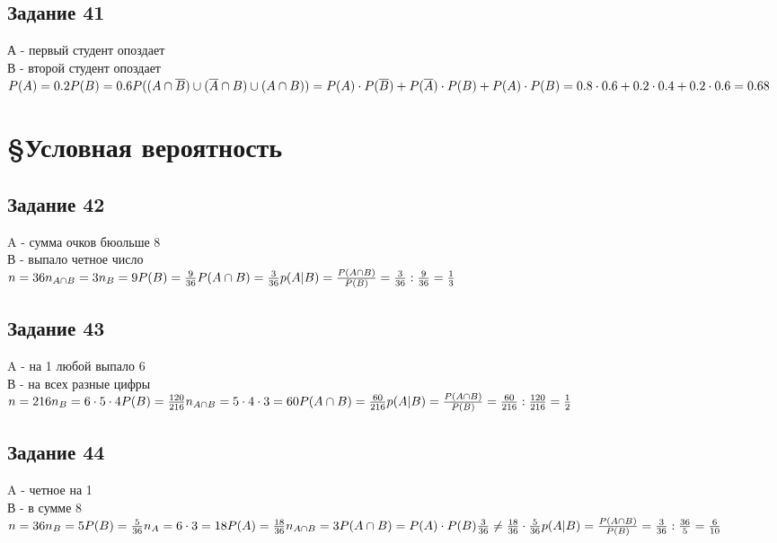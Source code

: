 \documentclass[12pt]{article}
\begin{document}
\newpage
\subsection{Задание 41}

А - первый студент опоздает\\
В - второй студент опоздает\\
$
P(A)=0.2\\
P(B)=0.6\\
P((A\cap \overline B)\cup 
(\overline A \cap B)\cup 
(A\cap B))=
P(A)\cdot P(\overline B)+
P(\overline A)\cdot P(B)+
P(A)\cdot P(B)=
0.8\cdot 0.6+0.2\cdot 0.4 + 0.2 \cdot 0.6=0.68
$

\newpage
\section{\S Условная вероятность}

\subsection{Задание 42}

A - сумма очков бюольше 8\\
В - выпало четное число\\
$
n=36\\
n_{A\cap B}=3\\
n_B=9\\
P(B)=\frac{9}{36}\\
P(A\cap B)=\frac{3}{36}\\
p(A|B)=\frac{P(A\cap B)}{P(B)}=\frac{3}{36} : \frac{9}{36}=\frac{1}{3}
$

\newpage
\subsection{Задание 43}
A - на 1 любой выпало 6\\
В - на всех разные цифры\\
$
n=216\\
 n_B=6\cdot 5\cdot 4\\
P(B)=\frac{120}{216}\\
n_{A\cap B}=5\cdot 4 \cdot 3 = 60\\
P(A\cap B)=\frac{60}{216}\\
p(A|B)=\frac{P(A\cap B)}{P(B)}=\frac{60}{216} : \frac{120}{216}=\frac{1}{2}
$

\newpage
\subsection{Задание 44}
A - четное на 1\\
В - в сумме 8\\
$
n=36\\
 n_B=5\\
P(B)=\frac{5}{36}\\
n_{A}=6 \cdot 3 = 18\\
P(A)=\frac{18}{36}\\
n_{A\cap B}=3\\
P(A\cap B)=P(A)\cdot P(B)\\
\frac{3}{36} \neq \frac{18}{36} \cdot \frac{5}{36} \\
p(A|B)=\frac{P(A\cap B)}{P(B)}=\frac{3}{36} : \frac{36}{5}=\frac{6}{10}
$
\end{document}
